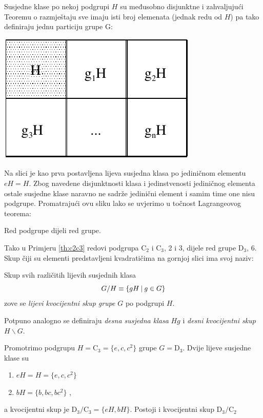 Susjedne klase po nekoj podgrupi $H$ su međusobno disjunktne i
zahvaljujući Teoremu o razmještaju sve imaju isti broj elemenata (jednak redu od $H$)
pa tako definiraju jednu particiju grupe G:\\[2ex]
\centerline{\includegraphics[scale=1.0]{pics/lagrange}}

Na slici je kao prva postavljena lijeva susjedna klasa po jediničnom
elementu $eH = H$. Zbog navedene disjunktnosti klasa i jedinstvenosti
jediničnog elementa ostale susjedne klase naravno ne sadrže jedinični element i
samim time one nisu podgrupe. 
Promatrajući ovu sliku lako se uvjerimo u točnost Lagrangeovog
teorema:

\begin{teorem}[Lagrange]
Red podgrupe dijeli red grupe.
\end{teorem}

Tako u Primjeru \ref{th:c2c3} redovi podgrupa C$_2$ i C$_3$, 2 i 3, dijele red
grupe D$_3$, 6. Skup čiji su elementi predstavljeni kvadratičima na gornjoj slici
ima svoj naziv:

\begin{definicija}
Skup svih različitih lijevih susjednih klasa 
\begin{displaymath}
      G/H \equiv \{gH \: | \: g\in G\}
\end{displaymath}
zove se \emph{lijevi kvocijentni skup grupe} $G$ po podgrupi $H$.
\end{definicija}

Potpuno analogno se definiraju \emph{desna susjedna klasa} $Hg$
i \emph{desni kvocijentni skup} $H\backslash G$.

\begin{primjer}[D$_3$]
    Promotrimo podgrupu $H=\mathrm{C}_3=\{e, c, c^2\}$ grupe $G=\mathrm{D}_3$.
Dvije lijeve susjedne klase su
\begin{enumerate}
\item $eH=H=\{e, c, c^2\}$ \; 
\item $bH=\{b, bc, bc^2\}$ \;,
\end{enumerate}
a kvocijentni skup je $\mathrm{D}_3/\mathrm{C}_3=\{eH, bH\}$. Postoji i kvocijentni 
skup $\mathrm{D}_3/\mathrm{C}_2$
\end{primjer}

